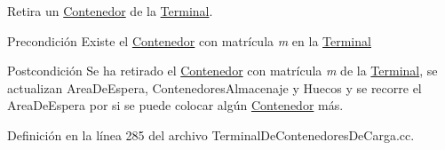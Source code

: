 Retira un \hyperlink{class_contenedor}{Contenedor} de la \hyperlink{class_terminal}{Terminal}. 

\begin{DoxyPrecond}{Precondición}
Existe el \hyperlink{class_contenedor}{Contenedor} con matrícula {\itshape m} en la \hyperlink{class_terminal}{Terminal} 
\end{DoxyPrecond}
\begin{DoxyPostcond}{Postcondición}
Se ha retirado el \hyperlink{class_contenedor}{Contenedor} con matrícula {\itshape m} de la \hyperlink{class_terminal}{Terminal}, se actualizan Area\+De\+Espera, Contenedores\+Almacenaje y Huecos y se recorre el Area\+De\+Espera por si se puede colocar algún \hyperlink{class_contenedor}{Contenedor} más. 
\end{DoxyPostcond}


Definición en la línea 285 del archivo Terminal\+De\+Contenedores\+De\+Carga.\+cc.



